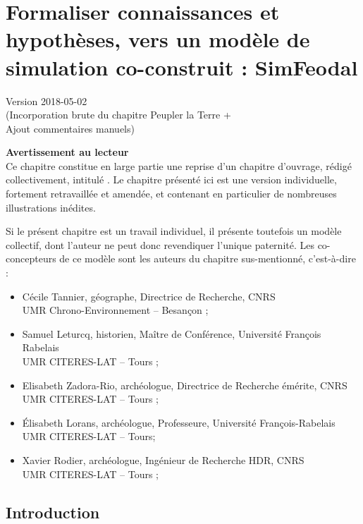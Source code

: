\chapter{Formaliser connaissances et hypothèses, vers un modèle de simulation co-construit : SimFeodal}
\begin{center}
	{\large Version 2018-05-02\\
		(Incorporation brute du chapitre Peupler la Terre +\\ Ajout commentaires manuels)}
\end{center}

\begin{mdframed}[backgroundcolor=gray!10,footnoteinside=false]
\textbf{Avertissement au lecteur}\\

Ce chapitre constitue en large partie une reprise d'un chapitre d'ouvrage, rédigé collectivement, intitulé  \autocite{cura_transition_2017}.
Le chapitre présenté ici est une version individuelle, fortement retravaillée et amendée, et contenant en particulier de nombreuses illustrations inédites.

Si le présent chapitre est un travail individuel, il présente toutefois un modèle collectif, dont l'auteur ne peut donc revendiquer l'unique paternité.
Les co-concepteurs de ce modèle sont les auteurs du chapitre sus-mentionné, c'est-à-dire :
\begin{itemize}
	\item Cécile Tannier, géographe, Directrice de Recherche, CNRS
	\\UMR Chrono-Environnement -- Besançon ;
	\item Samuel Leturcq, historien, Maître de Conférence, Université François Rabelais
	\\UMR CITERES-LAT -- Tours ; 
	\item Elisabeth Zadora-Rio, archéologue, Directrice de Recherche émérite, CNRS
	\\UMR CITERES-LAT -- Tours ;
	\item Élisabeth Lorans, archéologue, Professeure, Université François-Rabelais \\
	UMR CITERES-LAT -- Tours;
	\item Xavier Rodier, archéologue, Ingénieur de Recherche HDR, CNRS 
	\\UMR CITERES-LAT -- Tours ;
\end{itemize}
\end{mdframed}

\clearpage
\section{Introduction}

